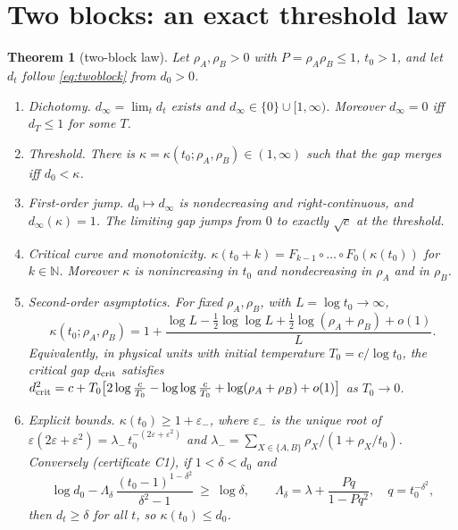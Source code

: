 \documentclass[10pt]{article}
\newtheorem{theorem}{Theorem}
\theoremstyle{definition}
\theoremstyle{remark}
\newcommand{\N}{\mathbb{N}}
\begin{document}
\section{Two blocks: an exact threshold law}\label{sec:twoblock}

\begin{theorem}[two-block law]\label{thm:two-block}
Let $\rho_A,\rho_B>0$ with $P=\rho_A\rho_B\le1$, $t_0>1$, and let $d_t$ follow \eqref{eq:twoblock} from $d_0>0$.
\begin{enumerate}[label=(\roman*),leftmargin=2em,itemsep=1pt]
\item \emph{Dichotomy.} $d_\infty=\lim_td_t$ exists and $d_\infty\in\{0\}\cup[1,\infty)$. Moreover $d_\infty=0$ iff $d_T\le1$ for some $T$.
\item \emph{Threshold.} There is $\kappa=\kappa(t_0;\rho_A,\rho_B)\in(1,\infty)$ such that the gap merges iff $d_0<\kappa$.
\item \emph{First-order jump.} $d_0\mapsto d_\infty$ is nondecreasing and right-continuous, and $d_\infty(\kappa)=1$. The limiting gap
jumps from $0$ to exactly $\sqrt c$ at the threshold.
\item \emph{Critical curve and monotonicity.} $\kappa(t_0+k)=F_{k-1}\circ\dots\circ F_0(\kappa(t_0))$ for $k\in\N$. Moreover $\kappa$ is
nonincreasing in $t_0$ and nondecreasing in $\rho_A$ and in $\rho_B$.
\item \emph{Second-order asymptotics.} For fixed $\rho_A,\rho_B$, with $L=\log t_0\to\infty$,
\[
\kappa(t_0;\rho_A,\rho_B)=1+\frac{\log L-\frac12\log\log L+\frac12\log(\rho_A+\rho_B)+o(1)}{L}.
\]
Equivalently, in physical units with initial temperature $T_0=c/\log t_0$, the critical gap $d_{\rm crit}$ satisfies
$d_{\rm crit}^2=c+T_0\big[2\log\frac c{T_0}-\log\log\frac c{T_0}+\log(\rho_A+\rho_B)+o(1)\big]$ as $T_0\to0$.
\item \emph{Explicit bounds.} $\kappa(t_0)\ge1+\varepsilon_-$, where $\varepsilon_-$ is the unique root of
$\varepsilon(2\varepsilon+\varepsilon^2)=\lambda_-\,t_0^{-(2\varepsilon+\varepsilon^2)}$ and
$\lambda_-=\sum_{X\in\{A,B\}}\rho_X/(1+\rho_X/t_0)$. Conversely (certificate C1), if $1<\delta<d_0$ and
\begin{equation}\label{eq:C1}
\log d_0-\Lambda_\delta\,\frac{(t_0-1)^{1-\delta^2}}{\delta^2-1}\ \ge\ \log\delta,\qquad
\Lambda_\delta=\lambda+\frac{Pq}{1-Pq^2},\quad q=t_0^{-\delta^2},
\end{equation}
then $d_t\ge\delta$ for all $t$, so $\kappa(t_0)\le d_0$.
\end{enumerate}
\end{theorem}
\end{document}
